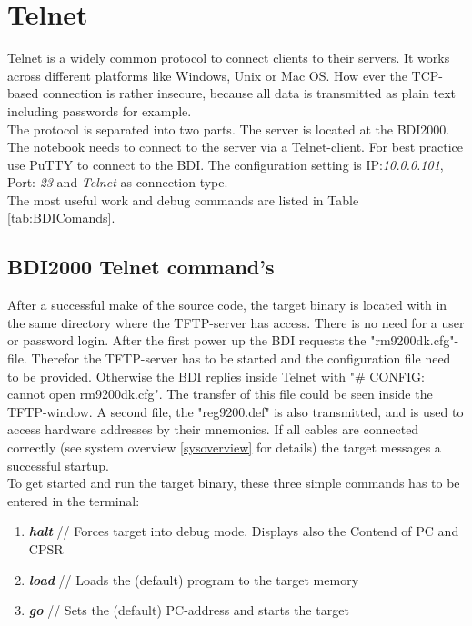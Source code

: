 \section{Telnet} 
\label{TEL}
Telnet is a widely common protocol to connect clients to their servers. It works across different platforms like Windows, Unix or Mac OS. How ever the TCP-based connection is rather insecure, because all data is transmitted as plain text including passwords for example.\\
The protocol is separated into two parts. The server is located at the BDI2000. The notebook needs to connect to the server via a Telnet-client. For best practice use PuTTY to connect to the BDI. The configuration setting is IP:\textit{10.0.0.101}, Port: \textit{23} and \textit{Telnet} as connection type.\\
The most useful work and debug commands are listed in Table \ref{tab:BDIComands}.\\

\subsection{BDI2000 Telnet command's} 

After a successful make of the source code, the target binary is located with in the same directory where the \ac{TFTP}-server has access. There is no need for a user or password login. After the first power up the BDI requests the "rm9200dk.cfg"-file. Therefor the \ac{TFTP}-server has to be started and the configuration file need to be provided. Otherwise the BDI replies inside Telnet with "\# CONFIG: cannot open rm9200dk.cfg". The transfer of this file could be seen inside the \ac{TFTP}-window. A second file, the "reg9200.def" is also transmitted, and is used to access hardware addresses by their mnemonics. If all cables are connected correctly (see system overview \ref{sysoverview} for details) the target messages a successful startup.\\
To get started and run the target binary, these three simple commands has to be entered in the terminal:
\begin{enumerate}
	\item \textbf{\textit{halt}} // Forces target into debug mode. Displays also the Contend of \ac{PC} and \ac{CPSR}
	\item \textbf{\textit{load}} // Loads the (default) program	to the target memory
	\item \textbf{\textit{go  }} // Sets the (default) \ac{PC}-address and starts the target 
	\end{enumerate}

